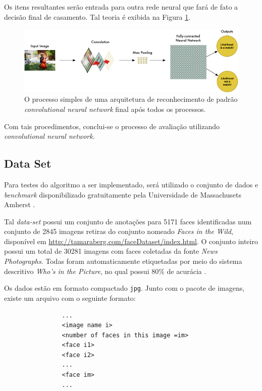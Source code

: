 \documentclass[10pt, conference]{IEEEtran}
\begin{document}
				Os itens resultantes serão entrada para outra rede neural que fará de fato a decisão final de casamento. Tal teoria é exibida na Figura \ref{fig:convolucao_teoria}.

				\begin{figure}[h]
					\centering
					\includegraphics[width=1.0\linewidth]{img/convolucao_teoria.png}
					\caption{O processo simples de uma arquitetura de reconhecimento de padrão \textit{convolutional neural network} final após todos os processos.}
					\label{fig:convolucao_teoria}
				\end{figure}

				Com tais procedimentos, conclui-se o processo de avaliação utilizando \textit{convolutional neural network}.


		\subsection{Data Set}
			Para testes do algoritmo a ser implementado, será utilizado o conjunto de dados e \textit{benchmark} disponibilizado gratuitamente pela Universidade de Massachusets Amherst \cite{fddbTech}.

			Tal \textit{data-set} possui um conjunto de anotações para 5171 faces identificadas num conjunto de 2845 imagens retiras do conjunto nomeado \textit{Faces in the Wild}, disponível em \url{http://tamaraberg.com/faceDataset/index.html}. O conjunto inteiro possui um total de 30281 imagens com faces coletadas da fonte \textit{News Photographs}. Todas foram automaticamente etiquetadas por meio do sistema descritivo \textit{Who's in the Picture}, no qual possui 80\% de acurácia \cite{berg2004s}.

			Os dados estão em formato compactado \texttt{jpg}. Junto com o pacote de imagens, existe um arquivo com o seguinte formato:

			\begin{verbatim}
				...
				<image name i>
				<number of faces in this image =im>
				<face i1>
				<face i2>
				...
				<face im>
				...
			\end{verbatim}
\end{document}
